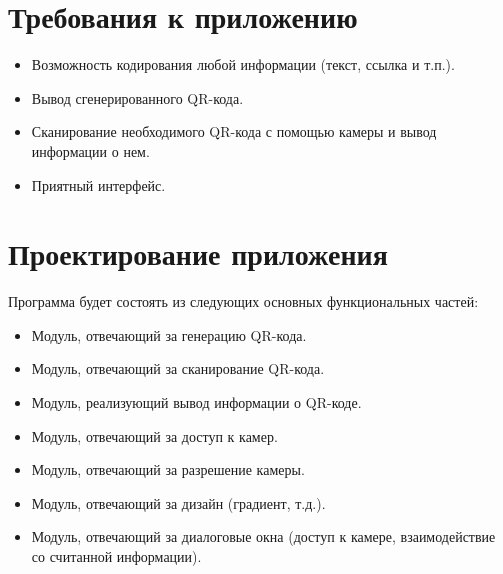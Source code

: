 \documentclass[a4paper,12pt]{article}
\begin{document}

\newpage


\section{Требования к приложению}
\begin{itemize}
    \item Возможность кодирования любой информации (текст, ссылка и т.п.).
    \item Вывод сгенерированного QR-кода.
    \item Сканирование необходимого QR-кода с помощью камеры и вывод информации о нем.
    \item Приятный интерфейс.
    
\end{itemize}



\section{Проектирование приложения}
Программа будет состоять из следующих основных функциональных частей:
\begin{itemize}
    \item Модуль, отвечающий за генерацию QR-кода.
    \item Модуль, отвечающий за сканирование QR-кода.
    \item Модуль, реализующий вывод информации о QR-коде.
    \item Модуль, отвечающий за доступ к камер.
    \item Модуль, отвечающий за разрешение камеры.
    \item Модуль, отвечающий за дизайн (градиент, т.д.).
    \item Модуль, отвечающий за диалоговые окна (доступ к камере, взаимодействие со считанной информации).
\end{itemize}


\newpage

\end{document}

